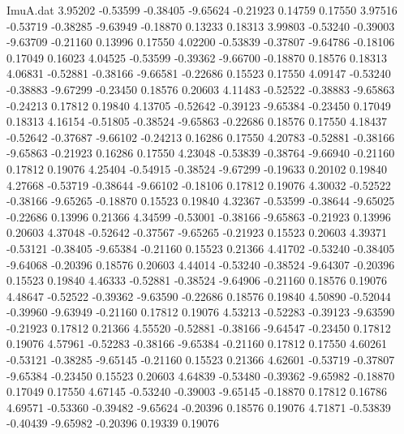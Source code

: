 \begin{filecontents}{ImuA.dat}
   3.95202   -0.53599   -0.38405   -9.65624   -0.21923    0.14759    0.17550
   3.97516   -0.53719   -0.38285   -9.63949   -0.18870    0.13233    0.18313
   3.99803   -0.53240   -0.39003   -9.63709   -0.21160    0.13996    0.17550
   4.02200   -0.53839   -0.37807   -9.64786   -0.18106    0.17049    0.16023
   4.04525   -0.53599   -0.39362   -9.66700   -0.18870    0.18576    0.18313
   4.06831   -0.52881   -0.38166   -9.66581   -0.22686    0.15523    0.17550
   4.09147   -0.53240   -0.38883   -9.67299   -0.23450    0.18576    0.20603
   4.11483   -0.52522   -0.38883   -9.65863   -0.24213    0.17812    0.19840
   4.13705   -0.52642   -0.39123   -9.65384   -0.23450    0.17049    0.18313
   4.16154   -0.51805   -0.38524   -9.65863   -0.22686    0.18576    0.17550
   4.18437   -0.52642   -0.37687   -9.66102   -0.24213    0.16286    0.17550
   4.20783   -0.52881   -0.38166   -9.65863   -0.21923    0.16286    0.17550
   4.23048   -0.53839   -0.38764   -9.66940   -0.21160    0.17812    0.19076
   4.25404   -0.54915   -0.38524   -9.67299   -0.19633    0.20102    0.19840
   4.27668   -0.53719   -0.38644   -9.66102   -0.18106    0.17812    0.19076
   4.30032   -0.52522   -0.38166   -9.65265   -0.18870    0.15523    0.19840
   4.32367   -0.53599   -0.38644   -9.65025   -0.22686    0.13996    0.21366
   4.34599   -0.53001   -0.38166   -9.65863   -0.21923    0.13996    0.20603
   4.37048   -0.52642   -0.37567   -9.65265   -0.21923    0.15523    0.20603
   4.39371   -0.53121   -0.38405   -9.65384   -0.21160    0.15523    0.21366
   4.41702   -0.53240   -0.38405   -9.64068   -0.20396    0.18576    0.20603
   4.44014   -0.53240   -0.38524   -9.64307   -0.20396    0.15523    0.19840
   4.46333   -0.52881   -0.38524   -9.64906   -0.21160    0.18576    0.19076
   4.48647   -0.52522   -0.39362   -9.63590   -0.22686    0.18576    0.19840
   4.50890   -0.52044   -0.39960   -9.63949   -0.21160    0.17812    0.19076
   4.53213   -0.52283   -0.39123   -9.63590   -0.21923    0.17812    0.21366
   4.55520   -0.52881   -0.38166   -9.64547   -0.23450    0.17812    0.19076
   4.57961   -0.52283   -0.38166   -9.65384   -0.21160    0.17812    0.17550
   4.60261   -0.53121   -0.38285   -9.65145   -0.21160    0.15523    0.21366
   4.62601   -0.53719   -0.37807   -9.65384   -0.23450    0.15523    0.20603
   4.64839   -0.53480   -0.39362   -9.65982   -0.18870    0.17049    0.17550
   4.67145   -0.53240   -0.39003   -9.65145   -0.18870    0.17812    0.16786
   4.69571   -0.53360   -0.39482   -9.65624   -0.20396    0.18576    0.19076
   4.71871   -0.53839   -0.40439   -9.65982   -0.20396    0.19339    0.19076

\end{filecontents}
